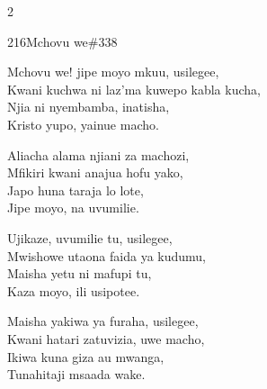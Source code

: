 \begin{multicols}{2}
\begin{hymn}{216}{Mchovu we}{\#338}
\begin{stanza}
Mchovu we! jipe moyo mkuu, usilegee,\\
Kwani kuchwa ni laz'ma kuwepo kabla kucha,\\
Njia ni nyembamba, inatisha,\\
Kristo yupo, yainue macho.
\end{stanza}
\begin{stanza}
Aliacha alama njiani za machozi,\\
Mfikiri kwani anajua hofu yako,\\
Japo huna taraja lo lote,\\
Jipe moyo, na uvumilie.
\end{stanza}
\begin{stanza}
Ujikaze, uvumilie tu, usilegee,\\
Mwishowe utaona faida ya kudumu,\\
Maisha yetu ni mafupi tu,\\
Kaza moyo, ili usipotee.
\end{stanza}
\begin{stanza}
Maisha yakiwa ya furaha, usilegee,\\
Kwani hatari zatuvizia, uwe macho,\\
Ikiwa kuna giza au mwanga,\\
Tunahitaji msaada wake.
\end{stanza}
\end{hymn}


\end{multicols}
